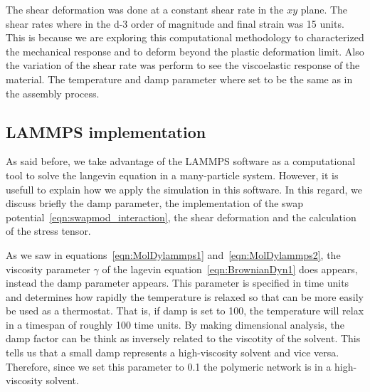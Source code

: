 The shear deformation was done at a constant shear rate in the $xy$ plane.
The shear rates where in the \num{d-3} order of magnitude and final strain was \num{15} units.
This is because we are exploring this computational methodology to characterized the mechanical response and to deform beyond the plastic deformation limit.
Also the variation of the shear rate was perform to see the viscoelastic response of the material.
The temperature and damp parameter where set to be the same as in the assembly process.

\subsection{LAMMPS implementation}

As said before, we take advantage of the LAMMPS software as a computational tool to solve the langevin equation in a many-particle system.
However, it is usefull to explain how we apply the simulation in this software.
In this regard, we discuss briefly the $\mathrm{damp}$ parameter, the implementation of the swap potential~\eqref{eqn:swapmod_interaction}, the shear deformation and the calculation of the stress tensor.

As we saw in equations~\eqref{eqn:MolDylammps1} and~\eqref{eqn:MolDylammps2}, the viscosity parameter $\gamma$ of the lagevin equation~\eqref{eqn:BrownianDyn1} does appears, instead the $\mathrm{damp}$ parameter appears.
This parameter is specified in time units and determines how rapidly the temperature is relaxed so that can be more easily be used as a thermostat\citep{LAMMPS}.
That is, if damp is set to \num{100}, the temperature will relax in a timespan of roughly \num{100} time units.
By making dimensional analysis, the damp factor can be think as inversely related to the viscotity of the solvent.
This tells us that a small damp represents a high-viscosity solvent and vice versa.
Therefore, since we set this parameter to \num{0.1} the polymeric network is in a high-viscosity solvent.

